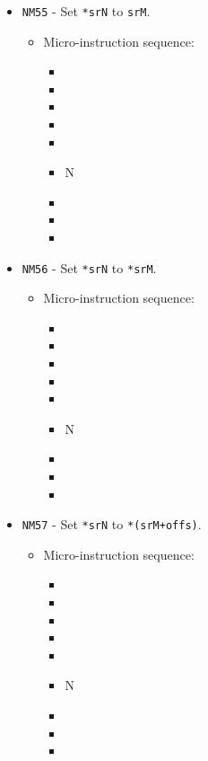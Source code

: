\documentclass{article}
\begin{document}
\begin{itemize}
    \item \Verb|NM55| - Set \Verb|*srN| to \Verb|srM|.
    \begin{itemize}
        \item Micro-instruction sequence:
        \begin{itemize}
            \item \pkptroutinc
            \item \datatooffs
            \item \incrementpk
            \item \pkptroutinc
            \item \holddata
            \item \specialtoaddr N
            \item \writeRAMo
            \item \incrementpk
            \item \done
        \end{itemize}
    \end{itemize}
    
    \item \Verb|NM56| - Set \Verb|*srN| to \Verb|*srM|.
    \begin{itemize}
        \item Micro-instruction sequence:
        \begin{itemize}
            \item \pkptroutinc
            \item \datatooffs
            \item \incrementpk
            \item \pkptroutinc
            \item \holddata
            \item \specialtoaddr N
            \item \writeRAMo
            \item \incrementpk
            \item \done
        \end{itemize}
    \end{itemize}
    
    \item \Verb|NM57| - Set \Verb|*srN| to \Verb|*(srM+offs)|.
    \begin{itemize}
        \item Micro-instruction sequence:
        \begin{itemize}
            \item \pkptroutinc
            \item \datatooffs
            \item \incrementpk
            \item \pkptroutinc
            \item \holddata
            \item \specialtoaddr N
            \item \writeRAMo
            \item \incrementpk
            \item \done
        \end{itemize}
    \end{itemize}


\end{itemize}
\end{document}
